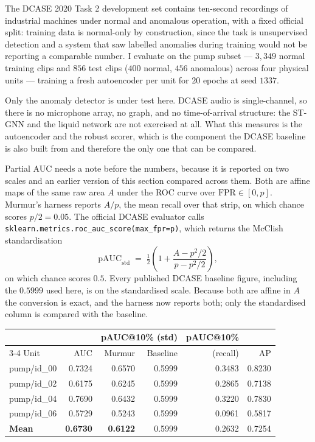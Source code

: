 \documentclass[11pt]{article}
\begin{document}
The DCASE 2020 Task 2 development set contains ten-second recordings of
industrial machines under normal and anomalous operation, with a fixed official
split: training data is normal-only by construction, since the task is
unsupervised detection and a system that saw labelled anomalies during training
would not be reporting a comparable number. I evaluate on the pump subset ---
$3{,}349$ normal training clips and $856$ test clips ($400$ normal, $456$
anomalous) across four physical units --- training a fresh autoencoder per unit
for $20$ epochs at seed $1337$.

Only the anomaly detector is under test here. DCASE audio is single-channel, so
there is no microphone array, no graph, and no time-of-arrival structure: the
ST-GNN and the liquid network are not exercised at all. What this measures is
the autoencoder and the robust scorer, which is the component the DCASE baseline
is also built from and therefore the only one that can be compared.

Partial AUC needs a note before the numbers, because it is reported on two
scales and an earlier version of this section compared across them. Both are
affine maps of the same raw area $A$ under the ROC curve over
$\mathrm{FPR} \in [0, p]$. Murmur's harness reports $A/p$, the mean recall over
that strip, on which chance scores $p/2 = 0.05$. The official DCASE evaluator
calls \texttt{sklearn.metrics.roc\_auc\_score(max\_fpr=p)}, which returns the
McClish standardisation
\[
\mathrm{pAUC}_{\mathrm{std}} \;=\; \tfrac{1}{2}\left(1 +
\frac{A - p^2/2}{p - p^2/2}\right),
\]
on which chance scores $0.5$. Every published DCASE baseline figure, including
the $0.5999$ used here, is on the standardised scale. Because both are affine in
$A$ the conversion is exact, and the harness now reports both; only the
standardised column is compared with the baseline.

\begin{center}
\begin{tabular}{lrrrrr}
\toprule
& & \multicolumn{2}{c}{pAUC@10\% (std)} & pAUC@10\% & \\
\cmidrule(lr){3-4}
Unit & AUC & Murmur & Baseline & (recall) & AP \\
\midrule
pump/id\_00 & 0.7324 & 0.6570 & 0.5999 & 0.3483 & 0.8230 \\
pump/id\_02 & 0.6175 & 0.6245 & 0.5999 & 0.2865 & 0.7138 \\
pump/id\_04 & 0.7690 & 0.6432 & 0.5999 & 0.3220 & 0.7830 \\
pump/id\_06 & 0.5729 & 0.5243 & 0.5999 & 0.0961 & 0.5817 \\
\midrule
\textbf{Mean} & \textbf{0.6730} & \textbf{0.6122} & 0.5999 & 0.2632 & 0.7254 \\
\bottomrule
\end{tabular}
\end{center}
\end{document}
